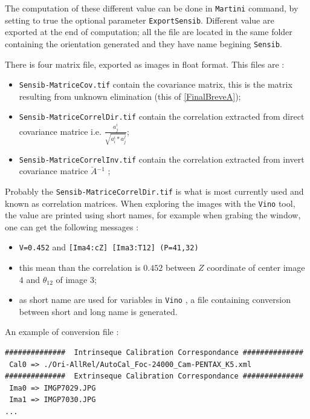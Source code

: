 The computation of these different value can be done in {\tt Martini} command,
by setting to true the optional parameter {\tt ExportSensib}. Different
value are exported at the end of computation; all the file are located
in the same folder containing the orientation generated and they  have name
begining  {\tt Sensib}.


There is four matrix file, exported as images in float format. This files
are : 

\begin{itemize}
     \item {\tt Sensib-MatriceCov.tif}  contain the covariance matrix,
           this is the matrix resulting from unknown elimination (this of \ref{FinalBreveA});

     \item {\tt Sensib-MatriceCorrelDir.tif}  contain the correlation extracted from
           direct covariance matrice i.e.  $ \frac{a^i_j}{\sqrt{a^i_i * a^j_j}}$;

     \item {\tt Sensib-MatriceCorrelInv.tif}  contain the correlation extracted from
           invert covariance matrice $\breve{A} {^{-1}}$  ;
\end{itemize}

Probably the {\tt Sensib-MatriceCorrelDir.tif} is what  is most currently used
and known as correlation matrices. When exploring the images with the {\tt Vino}
tool, the value are printed using short names, for example when grabing the 
window, one can get the following messages :


\begin{itemize}
     \item {\tt V=0.452} and {\tt [Ima4:cZ] [Ima3:T12] (P=41,32)}
     \item this mean than the correlation is $0.452$ between $Z$ coordinate of center
           image $4$  and $\theta_{12}$ of image $3$;
      \item as short name are used for variables in {\tt Vino} , a file containing conversion
            between short and long name is generated.
\end{itemize}


An example of conversion file :

\begin{verbatim}
##############  Intrinseque Calibration Correspondance ##############
 Cal0 => ./Ori-AllRel/AutoCal_Foc-24000_Cam-PENTAX_K5.xml
##############  Extrinseque Calibration Correspondance ##############
 Ima0 => IMGP7029.JPG
 Ima1 => IMGP7030.JPG
...
\end{verbatim}

